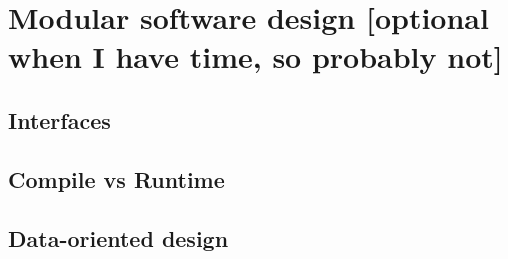 \chapter{Modular software design [optional when I have time, so probably not]}
\section{Interfaces}
\section{Compile vs Runtime}

\section{Data-oriented design}
